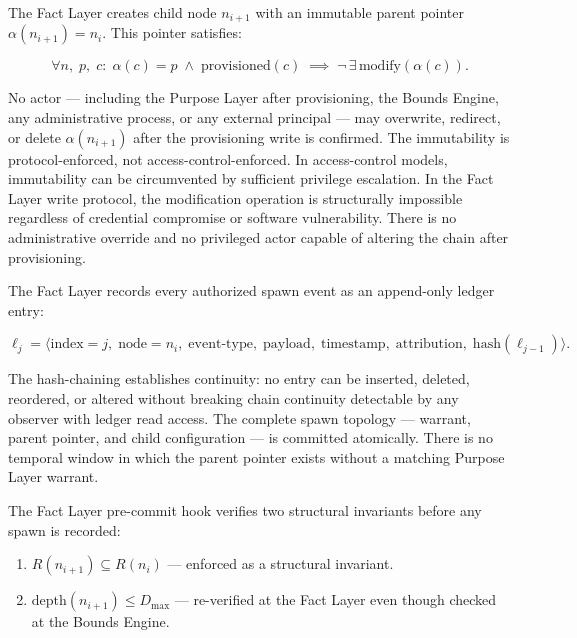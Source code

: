 The Fact Layer creates child node $n_{i+1}$ with an immutable parent pointer $\alpha(n_{i+1}) = n_i$. This pointer satisfies:

\begin{equation}
\forall n,\; p,\; c:\;
\alpha(c) = p \;\land\; \text{provisioned}(c)
\;\implies\;
\neg\,\exists\,\text{modify}(\alpha(c)).
\label{eq:rs-pointer-immutability}
\end{equation}

No actor — including the Purpose Layer after provisioning, the Bounds Engine, any administrative process, or any external principal — may overwrite, redirect, or delete $\alpha(n_{i+1})$ after the provisioning write is confirmed. The immutability is protocol-enforced, not access-control-enforced. In access-control models, immutability can be circumvented by sufficient privilege escalation. In the Fact Layer write protocol, the modification operation is structurally impossible regardless of credential compromise or software vulnerability. There is no administrative override and no privileged actor capable of altering the chain after provisioning.

The Fact Layer records every authorized spawn event as an append-only ledger entry:

\begin{equation}
\ell_j = \bigl\langle
\text{index}=j,\;
\text{node}=n_i,\;
\text{event-type},\;
\text{payload},\;
\text{timestamp},\;
\text{attribution},\;
\text{hash}(\ell_{j-1})
\bigr\rangle .
\label{eq:rs-ledger-entry}
\end{equation}

The hash-chaining establishes continuity: no entry can be inserted, deleted, reordered, or altered without breaking chain continuity detectable by any observer with ledger read access. The complete spawn topology — warrant, parent pointer, and child configuration — is committed atomically. There is no temporal window in which the parent pointer exists without a matching Purpose Layer warrant.

The Fact Layer pre-commit hook verifies two structural invariants before any spawn is recorded:

\begin{enumerate}
    \item[(FC1)] $R(n_{i+1}) \subseteq R(n_i)$ — enforced as a structural invariant.
    \item[(FC2)] $\text{depth}(n_{i+1}) \leq D_{\max}$ — re-verified at the Fact Layer even though checked at the Bounds Engine.
\end{enumerate}

